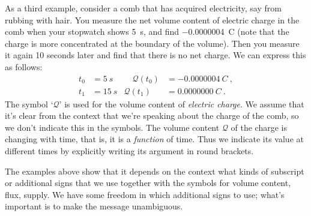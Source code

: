 \documentclass[a4paper,12pt,%
onecolumn,oneside,%
british%
]{memoir}
\renewcommand*{\|}[1][]{\nonscript\:#1\vert\nonscript\:\mathopen{}}
\newcommand*{\yti}{t_{0}}
\newcommand*{\ytf}{t_{1}}
\newcommand*{\yC}{\mathcal{Q}}
\begin{document}
%
%
As a third example, consider a comb that has acquired electricity, say from rubbing with hair. You measure the net volume content of electric charge in the comb when your stopwatch shows \qty{5}{s}, and find \qty{-0.0000004}{C} (note that the charge is more concentrated at the boundary of the volume). Then you measure it again 10 seconds later and find that there is no net charge. We can express this as follows:
\begin{equation*}
  \begin{aligned}
    \yti &= \qty{5}{s} &\quad \yC(\yti) &= \qty{-0.0000004}{C} \ ,
    \\
    \ytf &= \qty{15}{s} & \yC(\ytf) &= \qty{0.0000000}{C} \ .    %
  \end{aligned}
\end{equation*}
The symbol \enquote*{$\yC$} is used for the volume content of \emph{electric charge}. We assume that it's clear from the context that we're speaking about the charge of the comb, so we don't indicate this in the symbols. The volume content $\yC$ of the charge is changing with time, that is, it is a \emph{function} of time. Thus we indicate its value at different times by explicitly writing its argument in round brackets.

\medskip

The examples above show that it depends on the context what kinds of subscript or additional signs that we use together with the symbols for volume content, flux, supply. We have some freedom in which additional signs to use; what's important is to make the message unambiguous.
\end{document}
